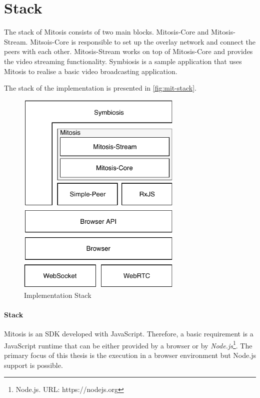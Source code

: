 \section{Stack}
The stack of Mitosis consists of two main blocks. Mitosis-Core and Mitosis-Stream. Mitsois-Core is responsible to set up the overlay network and connect the peers with each other. Mitosis-Stream works on top of Mitosis-Core and provides the video streaming functionality.
Symbiosis is a sample application that uses Mitosis to realise a basic video broadcasting application.

The stack of the implementation is presented in \vref{fig:mit-stack}.

\begin{figure}
\centering
\includegraphics[width=0.7\textwidth]{graphics/implementation/mitosis-overall.pdf}
\caption{Implementation Stack}
\label{fig:mit-stack}
\end{figure}

\paragraph{Stack}
Mitosis is an SDK developed with JavaScript. Therefore, a basic requirement is a JavaScript runtime that can be either provided by a browser or by \textit{Node.js}\footnote{Node.js. URL: {https://nodejs.org}}. The primary focus of this thesis is the execution in a browser environment but Node.js support is possible.


